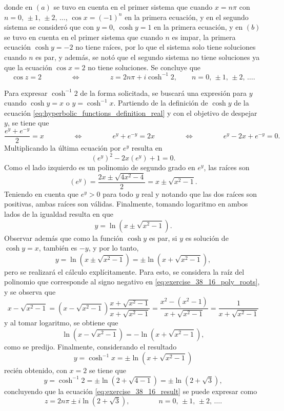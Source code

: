 \documentclass[a4paper]{report}
\begin{document}
donde en \((a)\) se tuvo en cuenta en el primer sistema que cuando \(x=n\pi\) con \(n=0,\,\pm1,\,\pm2,\,\dots\), \(\cos x=(-1)^n\) en la primera ecuación, y en el segundo sistema se consideró que con \(y=0\), \(\cosh y=1\) en la primera ecuación, y en \((b)\) se tuvo en cuenta en el primer sistema que cuando \(n\) es impar, la primera ecuación \(\cosh y=-2\) no tiene raíces, por lo que el sistema solo tiene soluciones cuando \(n\) es par, y además, se notó que el segundo sistema no tiene soluciones ya que la ecuación \(\cos x=2\) no tiene soluciones. Se concluye que 
\begin{equation}\label{eq:exercise_38_16_result}
 \cos z=2
 \qquad\qquad\Leftrightarrow\qquad\qquad
 z=2n\pi+i\cosh^{-1}2,
 \qquad n=0,\,\pm1,\,\pm2,\,\dots. 
\end{equation}

Para expresar \(\cosh^{-1}2\) de la forma solicitada, se buscará una expresión para \(y\) cuando \(\cosh y=x\) o \(y=\cosh^{-1}x\). Partiendo de la definición de \(\cosh y\) de la ecuación \ref{eq:hyperbolic_functions_definition_real} y con el objetivo de despejar \(y\), se tiene que 
\[
 \frac{e^y+e^{-y}}{2}=x
 \qquad\qquad\Leftrightarrow\qquad\qquad
 e^y+e^{-y}=2x
 \qquad\qquad\Leftrightarrow\qquad\qquad
 e^y-2x+e^{-y}=0.
\]
Multiplicando la última ecuación por \(e^y\) resulta en
\[
 (e^y)^2-2x(e^y)+1=0.
\]
Como el lado izquierdo es un polinomio de segundo grado en \(e^y\), las raíces son
\begin{equation}\label{eq:exercise_38_16_poly_roots}
 (e^y)=\frac{2x\pm\sqrt{4x^2-4}}{2}=x\pm\sqrt{x^2-1}.
\end{equation}
Teniendo en cuenta que \(e^y>0\) para todo \(y\) real y notando que las dos raíces son positivas, ambas raíces son válidas. Finalmente, tomando logaritmo en ambos lados de la igualdad resulta en que 
\[
 y=\ln(x\pm\sqrt{x^2-1}).
\]
Observar además que como la función \(\cosh y\) es par, si \(y\) es solución de \(\cosh y=x\), también es \(-y\), y por lo tanto,
\[
 y=\ln(x\pm\sqrt{x^2-1})=\pm\ln(x+\sqrt{x^2-1}),
\]
pero se realizará el cálculo explícitamente. Para esto, se considera la raíz del polinomio que corresponde al signo negativo en \ref{eq:exercise_38_16_poly_roots}, y se observa que 
\[
 x-\sqrt{x^2-1}=\left(x-\sqrt{x^2-1}\right)\frac{x+\sqrt{x^2-1}}{x+\sqrt{x^2-1}}
 =\frac{x^2-(x^2-1)}{x+\sqrt{x^2-1}}=\frac{1}{x+\sqrt{x^2-1}}
\]
y al tomar logaritmo, se obtiene que 
\[
 \ln(x-\sqrt{x^2-1})=-\ln(x+\sqrt{x^2-1}),
\]
como se predijo. Finalmente, considerando el resultado
\begin{equation}\label{eq:hyperbolic_functions_conh_inverse_as_ln_real}
  y=\cosh^{-1}x=\pm\ln(x+\sqrt{x^2-1})
\end{equation}
recién obtenido, con \(x=2\) se tiene que
\[
 y=\cosh^{-1}2=\pm\ln(2+\sqrt{4-1})=\pm\ln(2+\sqrt{3}),
\]
concluyendo que la ecuación \ref{eq:exercise_38_16_result} se puede expresar como
\[
 z=2n\pi\pm i\ln(2+\sqrt{3}),
 \qquad\qquad n=0,\,\pm1,\,\pm2,\,\dots.
\]
\end{document}
